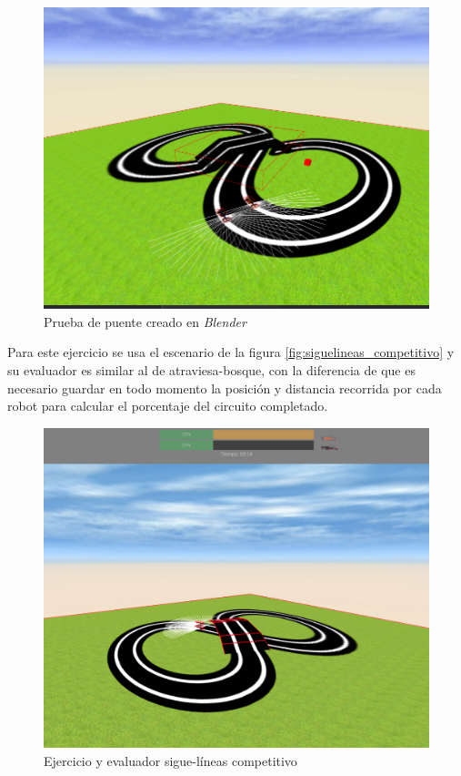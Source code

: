     \begin{figure}[H]
        \centering            
        \includegraphics[scale=0.3]{img/prueba_puente.png}
        \caption{Prueba de puente creado en \textit{Blender}}
        \label{fig:prueba_puente}
    \end{figure}

Para este ejercicio se usa el escenario de la figura \ref{fig:siguelineas_competitivo} y su evaluador es similar al de atraviesa-bosque, con la diferencia de que es necesario guardar en todo momento la posición y distancia recorrida por cada robot para calcular el porcentaje del circuito completado.


\begin{figure}[H]
    \centering           
    \includegraphics[scale=0.25]{img/evaluator_follow_line.png}
    \caption{Ejercicio y evaluador sigue-líneas competitivo}
    \label{fig:evaluador_siguelineas}
\end{figure}

